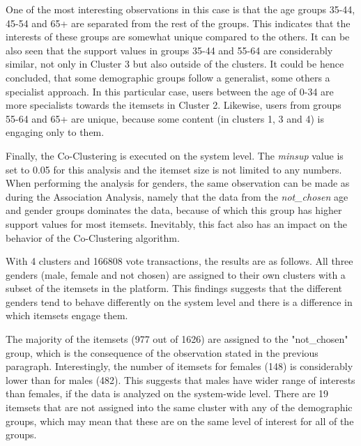 One of the most interesting observations in this case is that the age groups 35-44, 45-54 and 65+ are separated from the rest of the groups. This indicates that the interests of these groups are somewhat unique compared to the others. It can be also seen that the support values in groups 35-44 and 55-64 are considerably similar, not only in Cluster 3 but also outside of the clusters. It could be hence concluded, that some demographic groups follow a generalist, some others a specialist approach. In this particular case, users between the age of 0-34 are more specialists towards the itemsets in Cluster 2. Likewise, users from groups 55-64 and 65+ are unique, because some content (in clusters 1, 3 and 4) is engaging only to them. 


Finally, the Co-Clustering is executed on the system level. The \emph{minsup} value is set to 0.05 for this analysis and the itemset size is not limited to any numbers. When performing the analysis for genders, the same observation can be made as during the Association Analysis, namely that the data from the \emph{not\_chosen} age and gender groups dominates the data, because of which this group has higher support values for most itemsets. Inevitably, this fact also has an impact on the behavior of the Co-Clustering algorithm. 

With 4 clusters and 166808 vote transactions, the results are as follows. All three genders (male, female and not chosen) are assigned to their own clusters with a subset of the itemsets in the platform. This findings suggests that the different genders tend to behave differently on the system level and there is a difference in which itemsets engage them. 

The majority of the itemsets (977 out of 1626) are assigned to the "not\_chosen" group, which is the consequence of the observation stated in the previous paragraph. Interestingly, the number of itemsets for females (148) is considerably lower than for males (482). This suggests that males have wider range of interests than females, if the data is analyzed on the system-wide level. There are 19 itemsets that are not assigned into the same cluster with any of the demographic groups, which may mean that these are on the same level of interest for all of the groups. 

